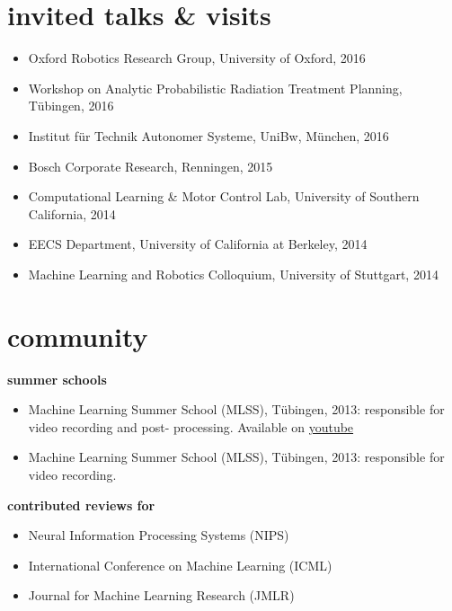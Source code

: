 \documentclass[a4paper]{k-cv} %
\begin{document}
\section{invited talks \& visits} \bodyfont
\begin{itemize}
  \item Oxford Robotics Research Group, University of Oxford, 2016
  \item Workshop on Analytic Probabilistic Radiation Treatment Planning,
    T{\"u}bingen, 2016
  \item Institut f{\"u}r Technik Autonomer Systeme, UniBw, M\"unchen, 2016
  \item Bosch Corporate Research, Renningen, 2015
  \item Computational Learning \& Motor Control Lab, University of Southern
    California, 2014
  \item EECS Department, University of California at Berkeley, 2014
  \item Machine Learning and Robotics Colloquium, University of Stuttgart, 2014
\end{itemize}



\section{community} \bodyfont
{\Large \bfseries summer schools}
\begin{itemize}
 \item Machine Learning Summer School (MLSS), T\"ubingen, 2013: responsible
for video recording and post- pro\-ces\-sing.
Available on \href{
https://www.youtube.com/playlist?list=PLqJm7Rc5-EXFv6RXaPZzzlzo93Hl0v91E } { \to
youtube}
  \item Machine Learning Summer School (MLSS), T\"ubingen, 2013: responsible
  for video recording.
\end{itemize}

{\Large \bfseries contributed reviews for}
\begin{itemize}
 \item Neural Information Processing Systems (NIPS)
 \item International Conference on Machine Learning (ICML)
 \item Journal for Machine Learning Research (JMLR)
\end{itemize}
\end{document}
